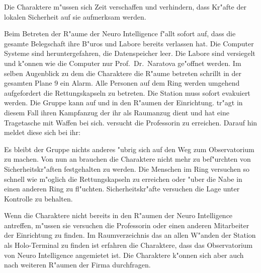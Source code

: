 
Die Charaktere m"ussen sich Zeit verschaffen und verhindern, dass Kr"afte der lokalen Sicherheit auf sie aufmerksam werden.

Beim Betreten der R"aume der Neuro Intelligence f"allt sofort auf, dass die gesamte Belegschaft ihre B"uros und Labore bereits verlassen hat. Die Computer Systeme sind heruntergefahren, die Datenspeicher leer. Die Labore sind versiegelt und k"onnen wie die Computer nur Prof.~Dr.~Naratova ge"offnet werden. Im selben Augenblick zu dem die Charaktere die R"aume betreten schrillt in der gesamten Plane 9 ein Alarm. Alle Personen auf dem Ring werden umgehend aufgefordert die Rettungskapseln zu betreten. Die Station muss sofort evakuiert werden.  Die Gruppe kann auf \xl{} und \ml{} in den R"aumen der Einrichtung. \xl{} tr"agt in diesem Fall ihren Kampfanzug der ihr als Raumanzug dient und hat eine Tragetasche mit Waffen bei sich. \ml{} versucht die Professorin zu erreichen. Darauf hin meldet diese sich bei ihr:


Es bleibt der Gruppe nichts anderes "ubrig sich auf den Weg zum Observatorium zu machen. Von nun an brauchen die Charaktere nicht mehr zu bef"urchten von Sicherheitskr"aften festgehalten zu werden. Die Menschen im Ring versuchen so schnell wie m"oglich die Rettungskapseln zu erreichen oder "uber die Nabe in einen anderen Ring zu fl"uchten. Sicherheitskr"afte versuchen die Lage unter Kontrolle zu behalten.

Wenn die Charaktere \ml{} nicht bereits in den R"aumen der Neuro Intelligence antreffen, m"ussen sie versuchen die Professorin oder einen anderen Mitarbeiter der Einrichtung zu finden. Im Raumverzeichnis das an allen W"anden der Station als Holo-Terminal zu finden ist erfahren die Charaktere, dass das Observatorium von Neuro Intelligence angemietet ist. Die Charaktere k"onnen sich aber auch nach weiteren R"aumen der Firma durchfragen.

